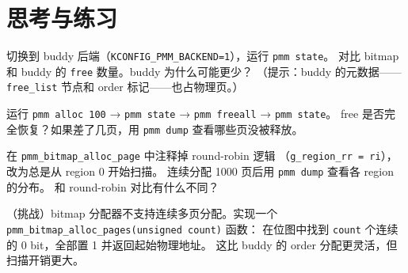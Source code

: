 \section{思考与练习}

\begin{exercise}
切换到 buddy 后端（\texttt{KCONFIG\_PMM\_BACKEND=1}），运行 \texttt{pmm state}。
对比 bitmap 和 buddy 的 \texttt{free} 数量。buddy 为什么可能更少？
（提示：buddy 的元数据——\texttt{free\_list} 节点和 order 标记——也占物理页。）
\end{exercise}

\begin{exercise}
运行 \texttt{pmm alloc 100} → \texttt{pmm state} → \texttt{pmm freeall} → \texttt{pmm state}。
free 是否完全恢复？如果差了几页，用 \texttt{pmm dump} 查看哪些页没被释放。
\end{exercise}

\begin{exercise}
在 \texttt{pmm\_bitmap\_alloc\_page} 中注释掉 round-robin 逻辑
（\texttt{g\_region\_rr = ri}），改为总是从 region 0 开始扫描。
连续分配 1000 页后用 \texttt{pmm dump} 查看各 region 的分布。
和 round-robin 对比有什么不同？
\end{exercise}

\begin{exercise}
（挑战）bitmap 分配器不支持连续多页分配。实现一个
\texttt{pmm\_bitmap\_alloc\_pages(unsigned count)} 函数：
在位图中找到 \texttt{count} 个连续的 0 bit，全部置 1 并返回起始物理地址。
这比 buddy 的 order 分配更灵活，但扫描开销更大。
\end{exercise}


